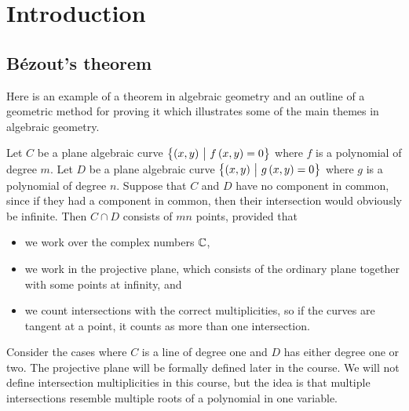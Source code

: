 





\section{Introduction}

\subsection{B\'ezout's theorem}


Here is an example of a theorem in algebraic geometry and an outline of a geometric method for proving it which illustrates some of the main themes in algebraic geometry.

\begin{theorem}[B\'ezout]
Let $ C $ be a plane algebraic curve $ \cbr{\br{x, y} \st f\br{x, y} = 0} $ where $ f $ is a polynomial of degree $ m $. Let $ D $ be a plane algebraic curve $ \cbr{\br{x, y} \st g\br{x, y} = 0} $ where $ g $ is a polynomial of degree $ n $. Suppose that $ C $ and $ D $ have no component in common, since if they had a component in common, then their intersection would obviously be infinite. Then $ C \cap D $ consists of $ mn $ points, provided that
\begin{itemize}
\item we work over the complex numbers $ \mathbb{C} $,
\item we work in the projective plane, which consists of the ordinary plane together with some points at infinity, and
\item we count intersections with the correct multiplicities, so if the curves are tangent at a point, it counts as more than one intersection.
\end{itemize}
\end{theorem}

Consider the cases where $ C $ is a line of degree one and $ D $ has either degree one or two. The projective plane will be formally defined later in the course. We will not define intersection multiplicities in this course, but the idea is that multiple intersections resemble multiple roots of a polynomial in one variable.

